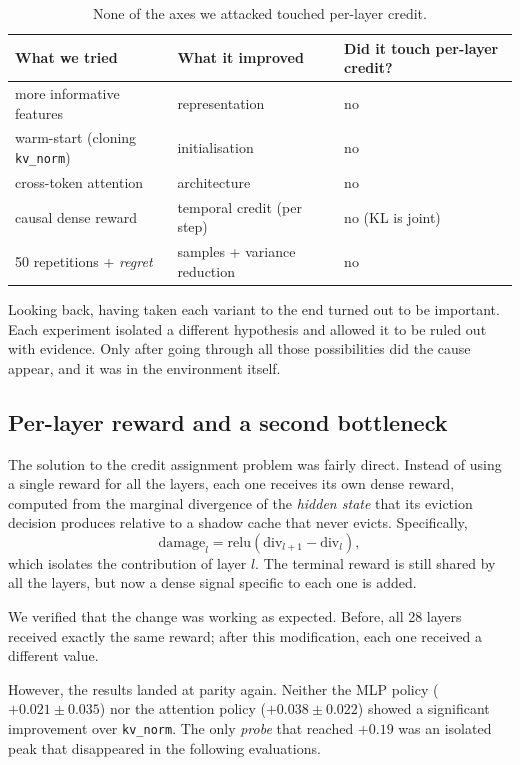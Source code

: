 \begin{table}[H]
\centering
\caption{None of the axes we attacked touched per-layer credit.}
\begin{tabular}[t]{lll}
\toprule
\textbf{What we tried} & \textbf{What it improved} & \textbf{Did it touch per-layer credit?}\\
\midrule
more informative features & representation & no\\
warm-start (cloning \texttt{kv\_norm}) & initialisation & no\\
cross-token attention & architecture & no\\
causal dense reward & temporal credit (per step) & no (KL is joint)\\
50 repetitions + \textit{regret} & samples + variance reduction & no\\
\bottomrule
\end{tabular}
\label{tab: root_cause}
\end{table}

Looking back, having taken each variant to the end turned out to be important. Each experiment isolated a different hypothesis and allowed it to be ruled out with evidence. Only after going through all those possibilities did the cause appear, and it was in the environment itself.


\subsection{Per-layer reward and a second bottleneck} \label{subsec: e9}


The solution to the credit assignment problem was fairly direct. Instead of using a single reward for all the layers, each one receives its own dense reward, computed from the marginal divergence of the \textit{hidden state} that its eviction decision produces relative to a shadow cache that never evicts. Specifically,
\[
    \mathrm{damage}_l = \mathrm{relu}(\mathrm{div}_{l+1}-\mathrm{div}_l),
\]
which isolates the contribution of layer \(l\). The terminal reward is still shared by all the layers, but now a dense signal specific to each one is added.

We verified that the change was working as expected. Before, all 28 layers received exactly the same reward; after this modification, each one received a different value.

However, the results landed at parity again. Neither the MLP policy ($+0.021\pm0.035$) nor the attention policy ($+0.038\pm0.022$) showed a significant improvement over \texttt{kv\_norm}. The only \textit{probe} that reached $+0.19$ was an isolated peak that disappeared in the following evaluations.


